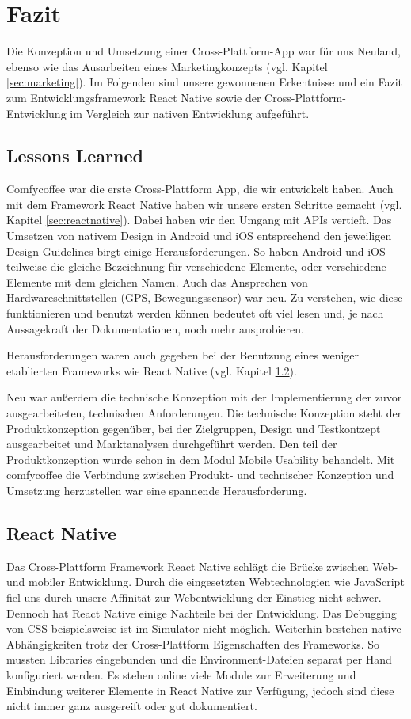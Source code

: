 \chapter{Fazit}
\label{fazit}
Die Konzeption und Umsetzung einer Cross-Plattform-App war für uns Neuland, ebenso wie das Ausarbeiten eines Marketingkonzepts (vgl. Kapitel \ref{sec:marketing}). Im Folgenden sind unsere gewonnenen Erkentnisse und ein Fazit zum Entwicklungsframework React Native sowie der Cross-Plattform-Entwicklung im Vergleich zur nativen Entwicklung aufgeführt.

\section{Lessons Learned}
Comfycoffee war die erste Cross-Plattform App, die wir entwickelt haben. Auch mit dem Framework React Native haben wir unsere ersten Schritte gemacht (vgl. Kapitel \ref{sec:reactnative}). Dabei haben wir den Umgang mit APIs vertieft. Das Umsetzen von nativem Design in Android und iOS entsprechend den jeweiligen Design Guidelines birgt einige Herausforderungen. So haben Android und iOS teilweise die gleiche Bezeichnung für verschiedene Elemente, oder verschiedene Elemente mit dem gleichen Namen. Auch das Ansprechen von Hardwareschnittstellen (GPS, Bewegungssensor) war neu. Zu verstehen, wie diese funktionieren und benutzt werden können bedeutet oft viel lesen und, je nach Aussagekraft der Dokumentationen, noch mehr ausprobieren.

Herausforderungen waren auch gegeben bei der Benutzung eines weniger etablierten Frameworks wie React Native (vgl. Kapitel \ref{sec:reactnativefazit}).

Neu war außerdem die technische Konzeption mit der Implementierung der zuvor ausgearbeiteten, technischen Anforderungen. Die technische Konzeption steht der Produktkonzeption gegenüber, bei der Zielgruppen, Design und Testkontzept ausgearbeitet und Marktanalysen durchgeführt werden. Den teil der Produktkonzeption wurde schon in dem Modul Mobile Usability behandelt. Mit comfycoffee die Verbindung zwischen Produkt- und technischer Konzeption und Umsetzung herzustellen war eine spannende Herausforderung.

\section{React Native}
\label{sec:reactnativefazit}
Das Cross-Plattform Framework React Native schlägt die Brücke zwischen Web- und mobiler Entwicklung. Durch die eingesetzten Webtechnologien wie JavaScript fiel uns durch unsere Affinität zur Webentwicklung der Einstieg nicht schwer. Dennoch hat React Native einige Nachteile bei der Entwicklung. Das Debugging von CSS beispielsweise ist im Simulator nicht möglich. Weiterhin bestehen native Abhängigkeiten trotz der Cross-Plattform Eigenschaften des Frameworks. So mussten Libraries eingebunden und die Environment-Dateien separat per Hand konfiguriert werden. Es stehen online viele Module zur Erweiterung und Einbindung weiterer Elemente in React Native zur Verfügung, jedoch sind diese nicht immer ganz ausgereift oder gut dokumentiert.


